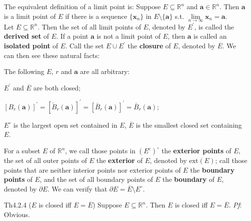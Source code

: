 \documentclass{article}
\begin{document}
\begin{Rmk}{}
    The equivalent definition of a limit point is: \textcolor{Df}{Suppose $E\subseteq\mathbb{R}^n$ and $\pmb{a}\in\mathbb{R}^n$. Then $\pmb{a}$ is a limit point of $E$ if there is a sequence $\{\pmb{x}_n\}$ in $E\setminus\{\pmb{a}\}$ s.t. $\lim\limits_{n\to\infty} \pmb{x}_n = \pmb{a}$.}\\
    \textcolor{Df}{Let $E\subseteq\mathbb{R}^n$. Then the set of all limit points of $E$, denoted by $E^\prime$, is called the \textbf{derived set} of $E$. If a point $\pmb{a}$ is not a limit point of $E$, then $\pmb{a}$ is called an \textbf{isolated point} of $E$. Call the set $E\cup E^\prime$ the \textbf{closure} of $E$, denoted by $\overline{E}$.} We can then see these natural facts: 
    \textcolor{Th}{The following $E$, $r$ and $\pmb{a}$ are all arbitrary:
    \begin{compactenum}
        \item $E^\prime$ and $\overline{E}$ are both closed;
        \item $[B_r(\pmb{a})]^\prime = [\check{B}_r(\pmb{a})]^\prime = [\bar{B}_r(\pmb{a})]^\prime = \bar{B}_r(\pmb{a})$;
        \item $E^\circ$ is the largest open set contained in $E$, $\overline{E}$ is the smallest closed set containing $E$.
    \end{compactenum}}
    \textcolor{Df}{For a subset $E$ of $\mathbb{R}^n$, we call those points in $(E^c)^\circ$ the \textbf{exterior points} of $E$, the set of all outer points of $E$ the \textbf{exterior} of $E$, denoted by $\text{ext}(E)$; call those points that are neither interior points nor exterior points of $E$ the \textbf{boundary points} of $E$, and the set of all boundary points of $E$ the \textbf{boundary} of $E$, denoted by $\partial E$.} \textcolor{Th}{We can verify that $\partial E = \overline{E}\setminus E^\circ$.}
\end{Rmk}

\begin{Th}{Th4.2.4 ($E$ is closed iff $E = \overline{E}$)}
    Suppose $E\subseteq\mathbb{R}^n$. Then $E$ is closed iff $E = \overline{E}$.
    \tcblower
    \textit{Pf}: Obvious.
\end{Th}
\end{document}
